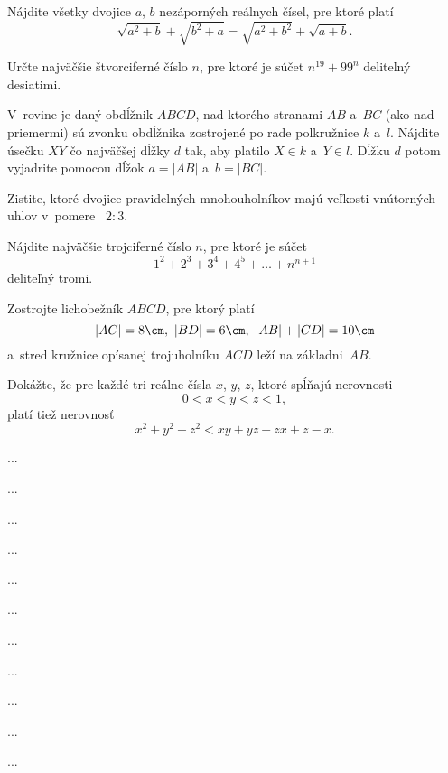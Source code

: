{%
Nájdite všetky dvojice $a$, $b$ nezáporných reálnych čísel, pre
ktoré platí
$$
\sqrt{a^2+b}+\sqrt{b^2+a}=
\sqrt{a^2+b^2}+\sqrt{a+b}.
$$}

{%
Určte najväčšie štvorciferné číslo $n$, pre ktoré je súčet
$n^{19}+99^n$ deliteľný desiatimi.}

{%
V~rovine je daný obdĺžnik $ABCD$, nad ktorého stranami $AB$ a~$BC$
(ako nad priemermi) sú zvonku obdĺžnika zostrojené po rade
polkružnice $k$ a~$l$. Nájdite úsečku $XY$ čo najväčšej dĺžky $d$
tak, aby platilo $X\in k$ a~$Y\in l$. Dĺžku $d$ potom vyjadrite
pomocou dĺžok $a=|AB|$ a~$b=|BC|$.}

{%
Zistite, ktoré dvojice pravidelných mnohouholníkov majú veľkosti
vnútorných uhlov v~pomere~ $2:3$.}

{%
Nájdite najväčšie trojciferné číslo $n$, pre ktoré je súčet
$$
1^2+2^3+3^4+4^5+\dots+n^{n+1}
$$
deliteľný tromi.}

{%
Zostrojte lichobežník $ABCD$, pre ktorý platí
$$
|AC|=8\cm, \ |BD|=6\cm,\ |AB|+|CD|=10\cm
$$
a~stred kružnice opísanej trojuholníku
$ACD$ leží na základni~$AB$.}

{%
Dokážte, že pre každé tri reálne čísla $x$, $y$, $z$, ktoré
spĺňajú nerovnosti
$$
0<x<y<z<1,
$$
platí tiež nerovnosť
$$
x^2+y^2+z^2<xy+yz+zx+z-x.
$$}

{%
...}

{%
...}

{%
...}

{%
...}

{%
...}

{%
...}

{%
...}

{%
...}

{%
...}

{%
...}

{%
...}

